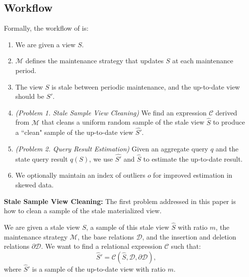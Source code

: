 
\subsection{\svc Workflow}
Formally, the workflow of \svc is:
\begin{enumerate}[noitemsep]
\item We are given a view $S$.
\item $\mathcal{M}$ defines the maintenance strategy that updates $S$ at each maintenance period.
\item The view $S$ is stale between periodic maintenance, and the up-to-date view should be $S'$.
\item \emph{(Problem 1. Stale Sample View Cleaning)} We find an expression $\mathcal{C}$ derived from $\mathcal{M}$ 
that cleans a uniform random sample of the stale view $\widehat{S}$ to produce a ``clean" sample of the up-to-date
view $\widehat{S'}$.
\item \emph{(Problem 2. Query Result Estimation)} Given an aggregate query $q$ and the state query result $q(S)$, we use $\widehat{S'}$ and $\widehat{S}$ to estimate the up-to-date result.
\item We optionally maintain an index of outliers $o$ for improved estimation in skewed data.
\end{enumerate} 

\noindent\textbf{Stale Sample View Cleaning: }
The first problem addressed in this paper is how to clean a sample of the stale materialized view.
\begin{problem}
We are given a stale view $S$, a sample of this stale view $\widehat{S}$ with ratio $m$, the maintenance strategy $\mathcal{M}$, the base relations $\mathcal{D}$, and
the insertion and deletion relations $\partial \mathcal{D}$.
We want to find a relational expression $\mathcal{C}$ such that:
\[
\widehat{S}' = \mathcal{C}(\widehat{S},\mathcal{D},\partial \mathcal{D}),
\]
where $\widehat{S}'$ is a sample of the up-to-date view with ratio $m$. 
\end{problem}

